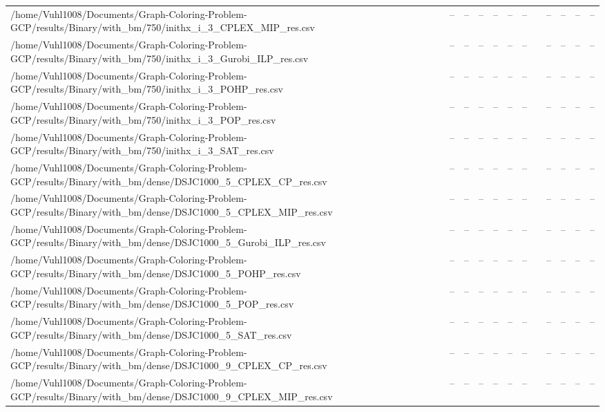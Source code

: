\begin{table}[htbp]
\begin{tabular}{llllllllllll}
/home/Vuhl1008/Documents/Graph-Coloring-Problem-GCP/results/Binary/with\_bm/750/inithx\_i\_3\_CPLEX\_MIP\_res.csv & -- & -- & -- & -- & -- & -- & {} & -- & -- & -- & -- \\
/home/Vuhl1008/Documents/Graph-Coloring-Problem-GCP/results/Binary/with\_bm/750/inithx\_i\_3\_Gurobi\_ILP\_res.csv & -- & -- & -- & -- & -- & -- & {} & -- & -- & -- & -- \\
/home/Vuhl1008/Documents/Graph-Coloring-Problem-GCP/results/Binary/with\_bm/750/inithx\_i\_3\_POHP\_res.csv & -- & -- & -- & -- & -- & -- & {} & -- & -- & -- & -- \\
/home/Vuhl1008/Documents/Graph-Coloring-Problem-GCP/results/Binary/with\_bm/750/inithx\_i\_3\_POP\_res.csv & -- & -- & -- & -- & -- & -- & {} & -- & -- & -- & -- \\
/home/Vuhl1008/Documents/Graph-Coloring-Problem-GCP/results/Binary/with\_bm/750/inithx\_i\_3\_SAT\_res.csv & -- & -- & -- & -- & -- & -- & {} & -- & -- & -- & -- \\
/home/Vuhl1008/Documents/Graph-Coloring-Problem-GCP/results/Binary/with\_bm/dense/DSJC1000\_5\_CPLEX\_CP\_res.csv & -- & -- & -- & -- & -- & -- & {} & -- & -- & -- & -- \\
/home/Vuhl1008/Documents/Graph-Coloring-Problem-GCP/results/Binary/with\_bm/dense/DSJC1000\_5\_CPLEX\_MIP\_res.csv & -- & -- & -- & -- & -- & -- & {} & -- & -- & -- & -- \\
/home/Vuhl1008/Documents/Graph-Coloring-Problem-GCP/results/Binary/with\_bm/dense/DSJC1000\_5\_Gurobi\_ILP\_res.csv & -- & -- & -- & -- & -- & -- & {} & -- & -- & -- & -- \\
/home/Vuhl1008/Documents/Graph-Coloring-Problem-GCP/results/Binary/with\_bm/dense/DSJC1000\_5\_POHP\_res.csv & -- & -- & -- & -- & -- & -- & {} & -- & -- & -- & -- \\
/home/Vuhl1008/Documents/Graph-Coloring-Problem-GCP/results/Binary/with\_bm/dense/DSJC1000\_5\_POP\_res.csv & -- & -- & -- & -- & -- & -- & {} & -- & -- & -- & -- \\
/home/Vuhl1008/Documents/Graph-Coloring-Problem-GCP/results/Binary/with\_bm/dense/DSJC1000\_5\_SAT\_res.csv & -- & -- & -- & -- & -- & -- & {} & -- & -- & -- & -- \\
/home/Vuhl1008/Documents/Graph-Coloring-Problem-GCP/results/Binary/with\_bm/dense/DSJC1000\_9\_CPLEX\_CP\_res.csv & -- & -- & -- & -- & -- & -- & {} & -- & -- & -- & -- \\
/home/Vuhl1008/Documents/Graph-Coloring-Problem-GCP/results/Binary/with\_bm/dense/DSJC1000\_9\_CPLEX\_MIP\_res.csv & -- & -- & -- & -- & -- & -- & {} & -- & -- & -- & -- \\

\end{tabular}
\end{table}
